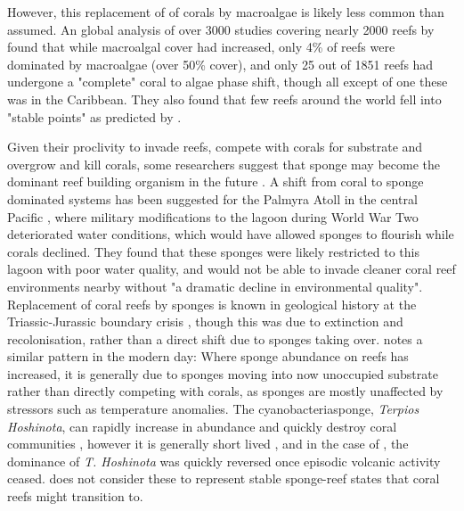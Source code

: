 \documentclass[11pt,a4paper]{article}
\begin{document}
However, this replacement of of corals by macroalgae is likely less common than assumed.
 An global analysis of over 3000 studies covering nearly 2000 reefs by \cite{Bruno2009} found that while macroalgal cover had increased, only 4\% of reefs were dominated by macroalgae (over 50\% cover), and only 25 out of 1851 reefs had undergone a "complete" coral to algae phase shift, though all except of one these was in the Caribbean.
 They also found that few reefs around the world fell into "stable points" as predicted by \cite{Mumby2007}.
 
Given their proclivity to invade reefs, compete with corals for substrate and overgrow and kill corals, some researchers suggest that sponge may become the dominant reef building organism in the future \citep{Bell2013}. 
 A shift from coral to sponge dominated systems has been suggested for the Palmyra Atoll in the central Pacific \citep{Knapp2013}, where military modifications to the lagoon during World War Two deteriorated water conditions, which would have allowed sponges to flourish while corals declined. %
 They found that these sponges were likely restricted to this lagoon with poor water quality, and would not be able to invade cleaner coral reef environments nearby without "a dramatic decline in environmental quality". 
Replacement of coral reefs by sponges is known in geological history at the Triassic-Jurassic boundary crisis \citep{Delecat2011}, though this was due to extinction and recolonisation, rather than a direct shift due to sponges taking over.
 \cite{Bell2013} notes a similar pattern in the modern day: Where sponge abundance on reefs has increased, it is generally due to sponges moving into now unoccupied substrate rather than directly competing with corals, as sponges are mostly unaffected by stressors such as temperature anomalies. 
 The cyanobacteriasponge, \textit{Terpios Hoshinota}, can rapidly increase in abundance and quickly destroy coral communities \citep{Schils2012,Elliott2016}, however it is generally short lived \citep{Reimer2010}, and in the case of \cite{Schils2012}, the dominance of \textit{T. Hoshinota} was quickly reversed once episodic volcanic activity ceased. \cite{Bell2013} does not consider these to represent stable sponge-reef states that coral reefs might transition to.
\end{document}
